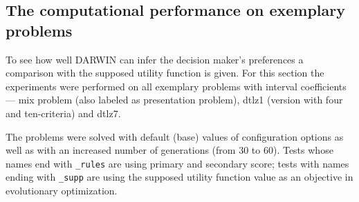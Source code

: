 \subsection{The computational performance on exemplary problems}
To see how well DARWIN can infer the decision maker's preferences a comparison
with the supposed utility function is given. For this section the experiments
were performed on all exemplary problems with interval coefficients --- mix
problem (also labeled as presentation problem), dtlz1 (version with four and
ten-criteria) and dtlz7.

The problems were solved with default (base) values of configuration options
as well as with an increased number of generations (from $30$ to $60$). Tests
whose names end with \texttt{\_rules} are using primary and secondary score;
tests with names ending with \texttt{\_supp} are using the supposed utility
function value as an objective in evolutionary optimization.

